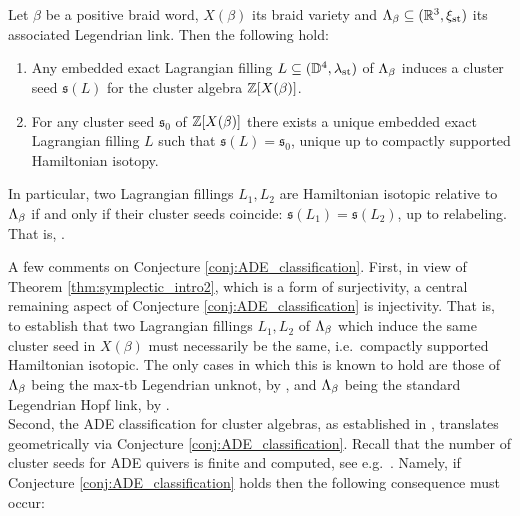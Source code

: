 \begin{fconj}\label{conj:ADE_classification}
Let $\beta$ be a positive braid word, $X(\beta)$ its braid variety and $\Lambda_\beta\subseteq(\mathbb{R}^3,\xi_{\text{st}})$ its associated Legendrian link. Then the following hold:\\

\begin{enumerate}[label=$(\arabic*)$]
    \item Any embedded exact Lagrangian filling $L\subseteq(\mathbb{D}^4,\lambda_{\text{st}})$ of $\La_\beta$ induces a cluster seed $\mathfrak{s}(L)$ for the cluster algebra  $\Z[X(\beta)]$.\\

    \item For any cluster seed $\mathfrak{s}_0$ of $\Z[X(\beta)]$ there exists a unique embedded exact Lagrangian filling $L$ such that $\mathfrak{s}(L)=\mathfrak{s}_0$, unique up to compactly supported Hamiltonian isotopy.\\
\end{enumerate}
 In particular, two Lagrangian fillings $L_1,L_2$ are Hamiltonian isotopic relative to $\La_\beta$ if and only if their cluster seeds coincide: $\mathfrak{s}(L_1)=\mathfrak{s}(L_2)$, up to relabeling. That is, \color{blue}{\bf the classification of Lagrangian fillings of $\La_\beta$, up to compactly supported Hamiltonian isotopy, coincides with the classification of cluster seeds in $\Z[X(\beta)]$}\color{black}.\\
\end{fconj}
\vspace{0.2cm}
A few comments on Conjecture \ref{conj:ADE_classification}. First, in view of Theorem \ref{thm:symplectic_intro2}, which is a form of surjectivity, a central remaining aspect of Conjecture \ref{conj:ADE_classification} is injectivity. That is, to establish that two Lagrangian fillings $L_1,L_2$ of $\La_\beta$ which induce the same cluster seed in $X(\beta)$ must necessarily be the same, i.e.~compactly supported Hamiltonian isotopic. The only cases in which this is known to hold are those of $\La_\beta$ being the max-tb Legendrian unknot, by \cite{EliashbergPolterovich96}, and $\La_\beta$ being the standard Legendrian Hopf link, by \cite{thomson2026legendrianhopflinkexactly}.\\

Second, the ADE classification for cluster algebras, as established in \cite{FZ2003II}, translates geometrically via Conjecture \ref{conj:ADE_classification}. Recall that the number of cluster seeds for ADE quivers is finite and computed, see e.g.~\cite[Section 5.9]{FWZ16}. Namely, if Conjecture \ref{conj:ADE_classification} holds then the following consequence must occur:

